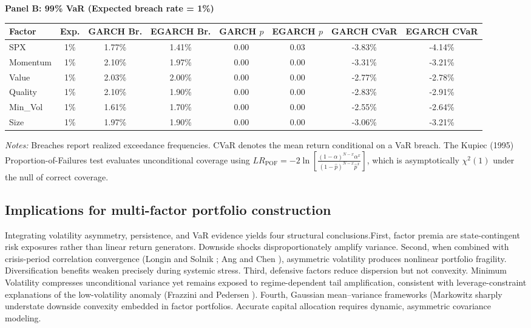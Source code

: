 \documentclass{article}
\begin{document}
\begin{landscape}
\begin{table}[!htbp]
{\begin{minipage}{\textwidth}
\textbf{Panel B: 99\% VaR (Expected breach rate = 1\%)}\\[4pt]
\begin{tabular}{lccccccc}
\toprule
Factor & Exp. & GARCH Br. & EGARCH Br. & GARCH $p$ & EGARCH $p$ & GARCH CVaR & EGARCH CVaR \\
\midrule
SPX      & 1\% & 1.77\% & 1.41\% & 0.00 & 0.03 & -3.83\% & -4.14\% \\
Momentum & 1\% & 2.10\% & 1.97\% & 0.00 & 0.00 & -3.31\% & -3.21\% \\
Value    & 1\% & 2.03\% & 2.00\% & 0.00 & 0.00 & -2.77\% & -2.78\% \\
Quality  & 1\% & 2.10\% & 1.90\% & 0.00 & 0.00 & -2.83\% & -2.91\% \\
Min\_Vol & 1\% & 1.61\% & 1.70\% & 0.00 & 0.00 & -2.55\% & -2.64\% \\
Size     & 1\% & 1.97\% & 1.90\% & 0.00 & 0.00 & -3.06\% & -3.21\% \\
\bottomrule
\end{tabular}

\vspace{8pt}
\footnotesize
\emph{Notes:} Breaches report realized exceedance frequencies. CVaR denotes the mean return conditional on a VaR breach. The Kupiec (1995) Proportion-of-Failures test evaluates unconditional coverage using 
$LR_{\mathrm{POF}}=-2\ln\left[\frac{(1-\alpha)^{N-x}\alpha^{x}}{(1-\hat{p})^{N-x}\hat{p}^{x}}\right]$, 
which is asymptotically $\chi^2(1)$ under the null of correct coverage.
\end{minipage}%
}
\end{table}
\end{landscape}

\newpage

\subsection{Implications for multi-factor portfolio construction}

Integrating volatility asymmetry, persistence, and VaR evidence yields four structural conclusions.First, factor premia are state-contingent risk exposures rather than linear return generators. Downside shocks disproportionately amplify variance. Second, when combined with crisis-period correlation convergence (Longin and Solnik \cite{longin2001}; Ang and Chen \cite{angchen2002}), asymmetric volatility produces nonlinear portfolio fragility. Diversification benefits weaken precisely during systemic stress. Third, defensive factors reduce dispersion but not convexity. Minimum Volatility compresses unconditional variance yet remains exposed to regime-dependent tail amplification, consistent with leverage-constraint explanations of the low-volatility anomaly (Frazzini and Pedersen \cite{frazzini2014}). Fourth, Gaussian mean–variance frameworks (Markowitz \cite{markowitz1952} sharply understate downside convexity embedded in factor portfolios. Accurate capital allocation requires dynamic, asymmetric covariance modeling.\newline
\end{document}
